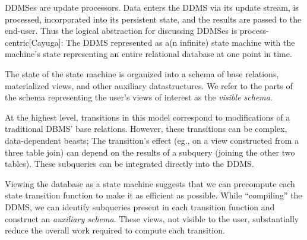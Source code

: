 

DDMSes are update processors.  Data enters the DDMS via its update stream, is
processed, incorporated into its persistent state, and the results are passed to
the end-user.  Thus the logical abstraction for discussing DDMSes is
process-centric[Cayuga]: The DDMS represented as a(n infinite) state machine with the
machine's state representing an entire relational database at one point in time.

The state of the state machine is organized into a schema of
base relations, materialized views, and other auxiliary datastructures.  We
refer to the parts of the schema representing the user's views of interest as the \textit{visible schema}.

At the highest level, transitions in this model correspond to modifications of a traditional DBMS' base relations.  However, these transitions can be complex, data-dependent beasts; The transition's effect (eg., on a view constructed from a three table join) can depend on the results of a subquery (joining the other two tables).  These subqueries can be integrated directly into the DDMS.

Viewing the database as a state machine suggests that we can precompute each state transition function to make it as efficient as possible.  While ``compiling'' the DDMS, we can identify subqueries present in each transition function and construct an \textit{auxiliary schema}.  These views, not visible to the user, substantially reduce the overall work required to compute each transition.

